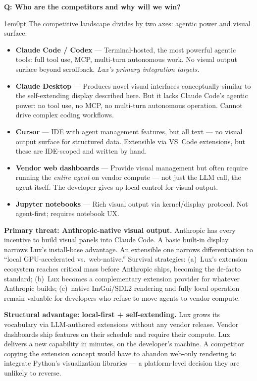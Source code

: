 \documentclass[11pt,letterpaper]{article}
\newcounter{faqnum}
\newenvironment{faqpair}[1]{%
  \needspace{4\baselineskip}%
  \vspace{0.5em}%
  \refstepcounter{faqnum}%
  \noindent\textbf{\color{SectionBlue}Q\thefaqnum: #1}\par\nopagebreak[4]%
  \vspace{0.2em}%
  \begin{adjustwidth}{1em}{0pt}%
  \setlength{\parindent}{0pt}%
}{%
  \end{adjustwidth}%
  \vspace{0.5em}%
}
\begin{document}
\begin{faqpair}{Who are the competitors and why will we win?}\label{faq:competitors}
  The competitive landscape divides by two axes: agentic power and visual
  surface.

  \begin{itemize}[nosep]
    \item \textbf{Claude Code / Codex} --- Terminal-hosted, the most
      powerful agentic tools: full tool use, MCP, multi-turn autonomous
      work.  No visual output surface beyond scrollback.  \emph{Lux's
      primary integration targets.}
    \item \textbf{Claude Desktop} --- Produces novel visual interfaces
      conceptually similar to the self-extending display described here.
      But it lacks Claude Code's agentic power: no tool use, no MCP, no
      multi-turn autonomous operation.  Cannot drive complex coding
      workflows.
    \item \textbf{Cursor} --- IDE with agent management features, but all
      text --- no visual output surface for structured data.  Extensible
      via VS~Code extensions, but these are IDE-scoped and written by hand.
    \item \textbf{Vendor web dashboards} --- Provide visual management but
      often require running the \emph{entire agent} on vendor compute ---
      not just the LLM call, the agent itself.  The developer gives up
      local control for visual output.
    \item \textbf{Jupyter notebooks} --- Rich visual output via
      kernel/display protocol.  Not agent-first; requires notebook UX.
  \end{itemize}

  \textbf{Primary threat: Anthropic-native visual output.}  Anthropic has
  every incentive to build visual panels into Claude Code.  A basic
  built-in display narrows Lux's install-base advantage.  An extensible
  one narrows differentiation to ``local GPU-accelerated vs.\ web-native.''
  Survival strategies: (a)~Lux's extension ecosystem reaches critical mass
  before Anthropic ships, becoming the de-facto standard; (b)~Lux becomes
  a complementary extension provider for whatever Anthropic builds;
  (c)~native ImGui/SDL2 rendering and fully local operation remain valuable
  for developers who refuse to move agents to vendor compute.

  \textbf{Structural advantage: local-first + self-extending.}  Lux grows
  its vocabulary via LLM-authored extensions without any vendor release.
  Vendor dashboards ship features on their schedule and require their
  compute.  Lux delivers a new capability in minutes, on the developer's
  machine.  A competitor copying the extension concept would have to abandon
  web-only rendering to integrate Python's visualization libraries ---
  a platform-level decision they are unlikely to reverse.
\end{faqpair}
\end{document}
